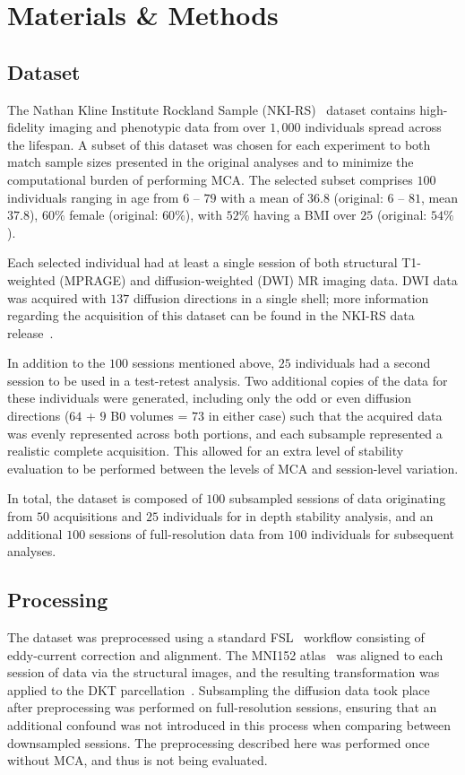 \documentclass[fleqn,10pt]{SelfArx} %
\begin{document}
\newpage
\section*{Materials \& Methods}

\subsection*{Dataset}
The Nathan Kline Institute Rockland Sample (NKI-RS)~\cite{Nooner2012-eg} dataset contains high-fidelity imaging and
phenotypic data from over $1,000$ individuals spread across the lifespan. A subset of this dataset was chosen for each
experiment to both match sample sizes presented in the original analyses and to minimize the computational burden of
performing MCA. The selected subset comprises $100$ individuals ranging in age from $6$ – $79$ with a mean of $36.8$
(original: $6$ – $81$, mean $37.8$), $60\%$ female (original: $60\%$), with $52\%$ having a BMI over $25$ (original:
$54\%$).

Each selected individual had at least a single session of both structural T1-weighted (MPRAGE) and diffusion-weighted
(DWI) MR imaging data. DWI data was acquired with $137$ diffusion directions in a single shell; more information regarding the
acquisition of this dataset can be found in the NKI-RS data release~\cite{Nooner2012-eg}.

In addition to the $100$ sessions mentioned above, $25$ individuals had a second session to be used in a test-retest
analysis. Two additional copies of the data for these individuals were generated, including only the odd or even
diffusion directions ($64$ + $9$ B0 volumes = $73$ in either case) such that the acquired data was evenly
represented across both portions, and each subsample represented a realistic complete acquisition. This allowed for
an extra level of stability evaluation to be performed between the levels of MCA and session-level variation.

In total, the dataset is composed of $100$ subsampled sessions of data originating from $50$ acquisitions
and $25$ individuals for in depth stability analysis, and an additional $100$ sessions of full-resolution data from
$100$ individuals for subsequent analyses.


\subsection*{Processing}
The dataset was preprocessed using a standard FSL~\cite{Jenkinson2012-ly} workflow consisting of eddy-current
correction and alignment. The MNI152 atlas~\cite{lancaster2007bias} was aligned to each session of data via the
structural images, and the resulting transformation was applied to the DKT parcellation~\cite{Klein2012-vi}.
Subsampling the diffusion data took place after preprocessing was performed on full-resolution sessions, ensuring that
an additional confound was not introduced in this process when comparing between downsampled sessions. The preprocessing
described here was performed once without MCA, and thus is not being evaluated.
\end{document}
